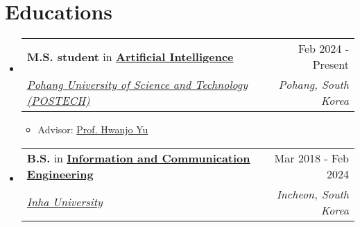 \documentclass[letterpaper,11pt]{article}
\makeatletter
\newcommand{\resumeSubheading}[4]{
  \vspace{-1pt}\item
    \begin{tabular*}{0.97\textwidth}{l@{\extracolsep{\fill}}r}
      #1 & #2 \\
      \textit{\small#3} & \textit{\small #4} \\
    \end{tabular*}\vspace{-5pt}
}
\makeatother
\begin{document}
    \section{Educations}
    \begin{itemize}[leftmargin=*,label=]
        \resumeSubheading
        {\textbf{M.S. student} in \textbf{\href{https://ai.postech.ac.kr/}{Artificial Intelligence}\textbf{}}}{Feb 2024 - Present}{\href{https://www.postech.ac.kr/eng/}{Pohang University of Science and Technology (POSTECH)}}{Pohang, South Korea}
            \begin{itemize}[label=\bullet]
                \item Advisor: \href{https://sites.google.com/view/postechdi/member/faculty?authuser=0}{Prof. Hwanjo Yu}
            \end{itemize}
            
        \resumeSubheading
        {\textbf{B.S.} in \textbf{\href{http://bit.ly/3Uu4LTi}{Information and Communication Engineering}}}{Mar 2018 - Feb 2024}{\href{https://eng.inha.ac.kr/eng/index.do}{Inha University}}{Incheon, South Korea}
            \begin{itemize}[label=\bullet]
            \end{itemize}

    \end{itemize}

    
\end{document}
